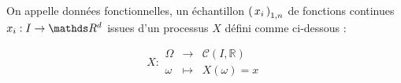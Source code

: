 \begin{definition}

    On appelle données fonctionnelles, un échantillon $\left( \, {x} _ {i} \, \right)_{1, n}$ de fonctions continues $x_i : I \rightarrow \R d$ issues d'un processus $X$ défini comme ci-dessous :

    $$X :
        \begin{array}{ccc}
            \Omega & \longrightarrow & \mathcal C(I, \mathds R)
            \\
            \omega & \longmapsto     & X(\omega) = x
        \end{array}
    $$

\end{definition}